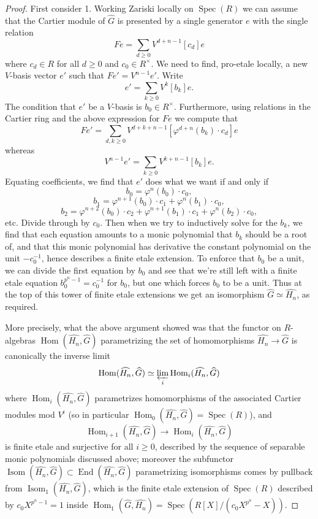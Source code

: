 \documentclass[10pt,a4paper]{amsart}
\newcommand{\on}{\operatorname}
\begin{document}
\begin{proof}
First consider 1.  Working Zariski locally on $\on{Spec}(R)$ we can assume that the Cartier module of $\widehat{G}$ is presented by a single generator $e$ with the single relation
$$Fe = \sum_{d\geq 0} V^{d+n-1} [c_d]e$$
where $c_d\in R$ for all $d\geq 0$ and $c_0\in R^\times$.  We need to find, pro-etale locally, a new $V$-basis vector $e'$ such that $Fe'=V^{n-1}e'$.  Write
$$e' = \sum_{k\geq 0} V^k[b_k]e.$$
The condition that $e'$ be a $V$-basis is $b_0\in R^\times$.  Furthermore, using relations in the Cartier ring and the above expression for $Fe$ we compute that
$$Fe' = \sum_{d,k\geq 0} V^{d+k+n-1}[\varphi^{d+n}(b_k)\cdot c_d]e$$
whereas
$$V^{n-1}e' = \sum_{k\geq 0} V^{k+n-1}[b_k]e.$$
Equating coefficients, we find that $e'$ does what we want if and only if
$$b_0 = \varphi^n(b_0)\cdot c_0,$$
$$b_1 = \varphi^{n+1}(b_0)\cdot c_1 + \varphi^n(b_1)\cdot c_0,$$
$$b_2 = \varphi^{n+2}(b_0)\cdot c_2 + \varphi^{n+1}(b_1)\cdot c_1 + \varphi^n(b_2)\cdot c_0,$$
etc.  Divide through by $c_0$.  Then when we try to inductively solve for the $b_k$, we find that each equation amounts to a monic polynomial that $b_k$ should be a root of, and that this monic polynomial has derivative the constant polynomial on the unit $-c_0^{-1}$, hence describes a finite etale extension.  To enforce that $b_0$ be a unit, we can divide the first equation by $b_0$ and see that we're still left with a finite etale equation $b_0^{p^n-1}=c_0^{-1}$ for $b_0$, but one which forces $b_0$ to be a unit.  Thus at the top of this tower of finite etale extensions we get an isomorphism $\widehat{G}\simeq \widehat{H_n}$, as required.

More precisely, what the above argument showed was that the functor on $R$-algebras $\on{Hom}(\widehat{H_n},\widehat{G})$ parametrizing the set of homomorphisms $\widehat{H_n}\to\widehat{G}$ is canonically the inverse limit
$$\on{Hom}(\widehat{H_n},\widehat{G})\simeq \varprojlim_i \on{Hom}_i(\widehat{H_n},\widehat{G})$$
where $\on{Hom}_i(\widehat{H_n},\widehat{G})$ parametrizes homomorphisms of the associated Cartier modules mod $V^i$ (so in particular $\on{Hom}_0(\widehat{H_n},\widehat{G})=\on{Spec}(R)$), and
$$\on{Hom}_{i+1}(\widehat{H_n},\widehat{G})\to \on{Hom}_i(\widehat{H_n},\widehat{G})$$
is finite etale and surjective for all $i\geq 0$, described by the sequence of separable monic polynomials discussed above; moreover the subfunctor $\on{Isom}(\widehat{H_n},\widehat{G})\subset \on{End}(\widehat{H_n},\widehat{G})$ parametrizing isomorphisms comes by pullback from $\on{Isom}_1(\widehat{H_n},\widehat{G})$, which is the finite etale extension of $\on{Spec}(R)$ described by $c_0X^{p^n-1}=1$ inside $\on{Hom}_1(\widehat{G},\widehat{H_n})=\on{Spec}(R[X]/(c_0X^{p^n}-X))$.


\end{proof}
\end{document}
